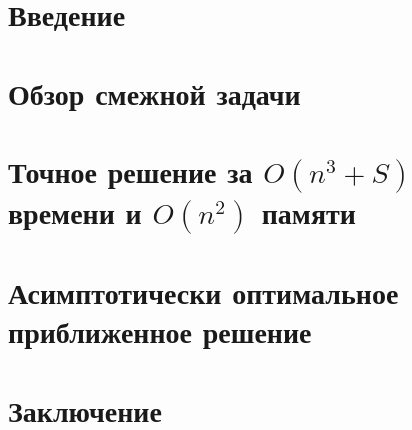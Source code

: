 \documentclass[14pt]{extarticle}
\begin{document}
%	
	
	\setcounter{page}{2}
	\begin{abstract}
		
	\end{abstract}
	\newpage
	
	\tableofcontents
	\newpage
	
	\section{Введение}
	
    \newpage
    
    \section{Обзор смежной задачи}
    
    \newpage
    
    \section{Точное решение за $O(n^3+S)$ времени и $O(n^2)$ памяти}
    
    \newpage
    
    \section{Асимптотически оптимальное приближенное решение}
    \newpage



	\section{Заключение}
	
	\newpage
	
	
\end{document}
